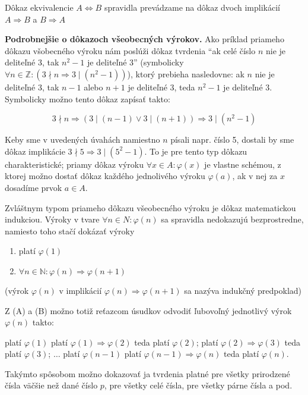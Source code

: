 Dôkaz ekvivalencie $A \iff B$ spravidla prevádzame na dôkaz dvoch implikácií
$A \Rightarrow B$ a $B \Rightarrow A$

\textbf{Podrobnejšie o dôkazoch všeobecných výrokov.} Ako príklad priameho
dôkazu všobecného výroku nám poslúži dôkaz tvrdenia \enquote{ak celé číslo $n$
nie je deliteľné 3, tak $n^2 - 1$ je deliteľné 3} (symbolicky $\forall n \in
\mathbb{Z}: (3 \nmid n \Rightarrow 3 \mid (n^2 - 1))$), ktorý prebieha
nasledovne: ak $n$ nie je deliteľné 3, tak $n - 1$ alebo $n + 1$ je deliteľné
3, teda $n^2 - 1$ je deliteľné 3. Symbolicky možno tento dôkaz zapísať takto:

$$
3 \nmid n
\Rightarrow (3 \mid (n - 1) \lor 3 \mid (n + 1))
\Rightarrow 3 \mid (n^2 - 1)
$$

Keby sme v uvedených úvahách namiestno $n$ písali napr. číslo 5, dostali by sme
dôkaz implikácie $3 \nmid 5 \Rightarrow 3 \mid (5^2 - 1)$. To je pre tento typ
dôkazu charakteristické; priamy dôkaz výroku $\forall x \in A: \varphi (x)$ je
vlastne schémou, z ktorej možno dostať dôkaz každého jednolivého výroku
$\varphi (a)$, ak v nej za $x$ dosadíme prvok $a \in A$.

Zvláštnym typom priameho dôkazu všeobecného výroku je dôkaz matematickou
indukciou. Výroky v tvare $\forall n \in N: \varphi (n)$ sa spravidla
nedokazujú bezprostredne, namiesto toho stačí dokázať výroky

\begin{center}
  \begin{enumerate}[label=(\Alph*)]
    \item platí $\varphi (1)$
    \item $\forall n \in \mathbb{N}: \varphi (n) \Rightarrow \varphi (n + 1)$
  \end{enumerate}
\end{center}

(výrok $\varphi (n)$ v implikácií $\varphi (n) \Rightarrow \varphi (n + 1)$ sa
nazýva indukčný predpoklad)

Z (A) a (B) možno totiž reťazcom úsudkov odvodiť ľubovoľný jednotlivý výrok
$\varphi (n)$ takto:

platí $\varphi (1)$
platí $\varphi (1) \Rightarrow \varphi (2)$
\hline
teda platí $\varphi (2)$;
platí $\varphi(2) \Rightarrow \varphi(3)$
teda platí $\varphi(3)$;
$\ldots$
platí $\varphi (n - 1)$
platí $\varphi (n - 1) \Rightarrow \varphi (n)$
teda platí $\varphi (n)$.

Takýmto spôsobom možno dokazovať ja tvrdenia platné pre všetky prirodzené čísla
väčšie než dané číslo $p$, pre všetky celé čísla, pre všetky párne čísla a pod.

